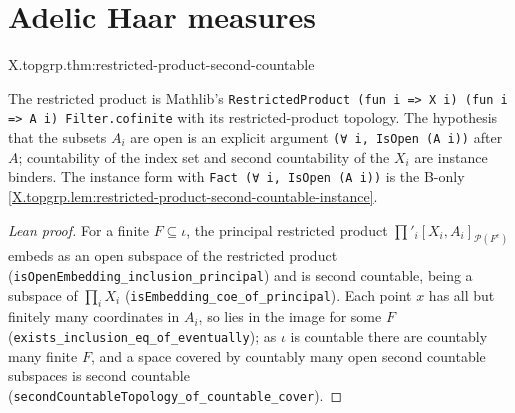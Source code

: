 \section{Adelic Haar measures}
\begin{theorem}
\end{theorem}
\begin{tfformal}{X.topgrp.thm:restricted-product-second-countable}
\begin{tffidelity}
The restricted product is Mathlib's \texttt{RestrictedProduct (fun i => X i) (fun i => A i) Filter.cofinite} with its restricted-product topology. The hypothesis that the subsets $A_i$ are open is an explicit argument \texttt{(∀ i, IsOpen (A i))} after $A$; countability of the index set and second countability of the $X_i$ are instance binders. The instance form with \texttt{Fact (∀ i, IsOpen (A i))} is the B-only \cref{X.topgrp.lem:restricted-product-second-countable-instance}.
\end{tffidelity}
\end{tfformal}
\begin{proof}[Lean proof]
For a finite $F\subseteq\iota$, the principal restricted product $\prod'_i[X_i,A_i]_{\mathcal P(F^c)}$ embeds as an open subspace of the restricted product (\texttt{isOpenEmbedding\_inclusion\_principal}) and is second countable, being a subspace of $\prod_iX_i$ (\texttt{isEmbedding\_coe\_of\_principal}). Each point $x$ has all but finitely many coordinates in $A_i$, so lies in the image for some $F$ (\texttt{exists\_inclusion\_eq\_of\_eventually}); as $\iota$ is countable there are countably many finite $F$, and a space covered by countably many open second countable subspaces is second countable (\texttt{secondCountableTopology\_of\_countable\_cover}).
\end{proof}


